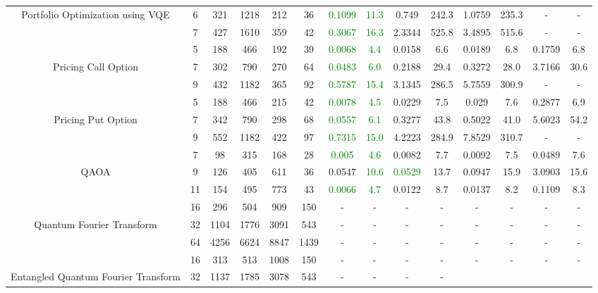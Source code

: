 \begin{table}[htb]
{\begin{tabular}{|c|c|c|c|c|c|c|c|c|c|c|c|c|c|}
Portfolio Optimization using VQE & 
6 & 321 & 1218 & 212 & 36
 & \textcolor{green}{0.1099} & \textcolor{green}{11.3}
 & 0.749 & 242.3
 & 1.0759 & 235.3
 & - & -
 \\
 & 
7 & 427 & 1610 & 359 & 42
 & \textcolor{green}{0.3067} & \textcolor{green}{16.3}
 & 2.3344 & 525.8
 & 3.4895 & 515.6
 & - & -
 \\
\hline
 & 
5 & 188 & 466 & 192 & 39
 & \textcolor{green}{0.0068} & \textcolor{green}{4.4}
 & 0.0158 & 6.6
 & 0.0189 & 6.8
 & 0.1759 & 6.8
 \\
Pricing Call Option & 
7 & 302 & 790 & 270 & 64
 & \textcolor{green}{0.0483} & \textcolor{green}{6.0}
 & 0.2188 & 29.4
 & 0.3272 & 28.0
 & 3.7166 & 30.6
 \\
 & 
9 & 432 & 1182 & 365 & 92
 & \textcolor{green}{0.5787} & \textcolor{green}{15.4}
 & 3.1345 & 286.5
 & 5.7559 & 300.9
 & - & -
 \\
\hline
 & 
5 & 188 & 466 & 215 & 42
 & \textcolor{green}{0.0078} & \textcolor{green}{4.5}
 & 0.0229 & 7.5
 & 0.029 & 7.6
 & 0.2877 & 6.9
 \\
Pricing Put Option & 
7 & 342 & 790 & 298 & 68
 & \textcolor{green}{0.0557} & \textcolor{green}{6.1}
 & 0.3277 & 43.8
 & 0.5022 & 41.0
 & 5.6023 & 54.2
 \\
 & 
9 & 552 & 1182 & 422 & 97
 & \textcolor{green}{0.7315} & \textcolor{green}{15.0}
 & 4.2223 & 284.9
 & 7.8529 & 310.7
 & - & -
 \\
\hline
 & 
7 & 98 & 315 & 168 & 28
 & \textcolor{green}{0.005} & \textcolor{green}{4.6}
 & 0.0082 & 7.7
 & 0.0092 & 7.5
 & 0.0489 & 7.6
 \\
QAOA & 
9 & 126 & 405 & 611 & 36
 & 0.0547 & \textcolor{green}{10.6}
 & \textcolor{green}{0.0529} & 13.7
 & 0.0947 & 15.9
 & 3.0903 & 15.6
 \\
 & 
11 & 154 & 495 & 773 & 43
 & \textcolor{green}{0.0066} & \textcolor{green}{4.7}
 & 0.0122 & 8.7
 & 0.0137 & 8.2
 & 0.1109 & 8.3
 \\
\hline
 & 
16 & 296 & 504 & 909 & 150
 & - & -
 & - & -
 & - & -
 & - & -
 \\
Quantum Fourier Transform & 
32 & 1104 & 1776 & 3091 & 543
 & - & -
 & - & -
 & - & -
 & - & -
 \\
 & 
64 & 4256 & 6624 & 8847 & 1439
 & - & -
 & - & -
 & - & -
 & - & -
 \\
\hline
 & 
16 & 313 & 513 & 1008 & 150
 & - & -
 & - & -
 & - & -
 & - & -
 \\
Entangled Quantum Fourier Transform & 
32 & 1137 & 1785 & 3078 & 543
 & - & -
 & - & -

\end{tabular}}
\end{table}
